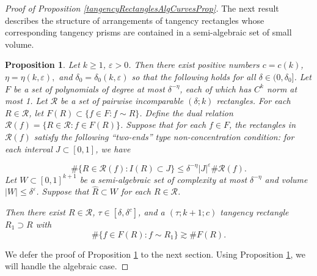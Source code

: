 \documentclass[letterpaper, reqno,11pt]{article}
\numberwithin{equation}{section}
\newcommand{\eps}{\varepsilon}
\numberwithin{thm}{section}
\newtheorem{prop}[thm]{Proposition}
\theoremstyle{remark}
\begin{document}
\begin{proof}[Proof of Proposition \ref{tangencyRectanglesAlgCurvesProp}]
The next result describes the structure of arrangements of tangency rectangles whose corresponding tangency prisms are contained in a semi-algebraic set of small volume. 
\begin{prop}\label{tangencyRectanglesInsideSemiAlgSetProp}
Let $k\geq 1$, $\eps>0$. Then there exist positive numbers $c=c(k)$, $\eta=\eta(k,\eps),$ and $\delta_0=\delta_0(k,\eps)$ so that the following holds for all $\delta\in(0,\delta_0]$. 
%
Let $F$ be a set of polynomials of degree at most $\delta^{-\eta}$, each of which has $C^k$ norm at most 1. Let $\mathcal{R}$ be a set of pairwise incomparable $(\delta;k)$ rectangles. For each $R\in\mathcal{R}$, let $F(R)\subset\{f\in F\colon f\sim R\}$. Define the dual relation $\mathcal{R}(f) = \{R\in\mathcal{R}\colon f\in F(R)\}$. Suppose that for each $f\in F$, the rectangles in $\mathcal{R}(f)$ satisfy the following ``two-ends'' type non-concentration condition: for each interval $J\subset[0,1]$, we have

\begin{equation}\label{twoEndsAlongEachCurveInProp}
    \# \{R\in\mathcal{R}(f) \colon I(R)\subset J\}\leq \delta^{-\eta} |J|^{\eps}\#\mathcal{R}(f).
\end{equation}
Let $W\subset [0,1]^{k+1}$ be a semi-algebraic set of complexity at most $\delta^{-\eta}$ and volume $|W|\leq \delta^\eps$. Suppose that $\hat R\subset W$ for each $R\in\mathcal{R}$. 

Then there exist $R\in\mathcal{R}$, $\tau\in [\delta,\delta^{c}]$, and a $(\tau; k+1; c)$ tangency rectangle $R_1\supset R$ with
\begin{equation}
\#\{f\in F(R)\colon f\sim R_1\} \gtrsim \#F(R).
\end{equation}
\end{prop}


We defer the proof of Proposition \ref{tangencyRectanglesInsideSemiAlgSetProp} to the next section. Using Proposition \ref{tangencyRectanglesInsideSemiAlgSetProp}, we will handle the algebraic case.  


\end{proof}
\end{document}
